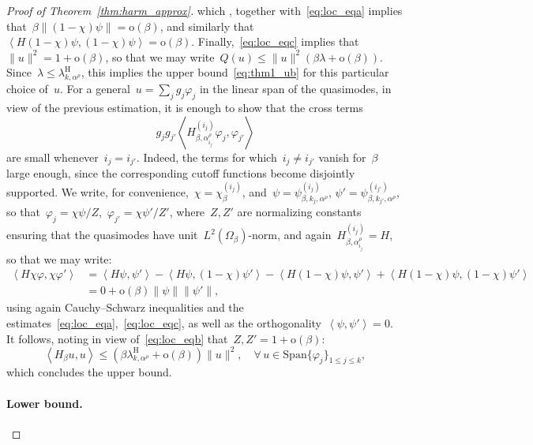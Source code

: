 \documentclass[10pt]{article}
\newcommand{\1}{\mathbbm 1}
\newcommand{\shift}{\rho} %
\begin{document}
\begin{proof}[Proof of Theorem~\ref{thm:harm_approx}]
        which , together with~\eqref{eq:loc_eqa} implies that~$\beta\|(1-\chi)\psi\|=\mathrm{o}(\beta)$, and similarly that~$\left\langle H(1-\chi)\psi,(1-\chi)\psi\right\rangle = \mathrm{o}(\beta)$.
        Finally,~\eqref{eq:loc_eqc} implies that~$\|u\|^2 = 1 + \mathrm{o}(\beta)$, so that we may write~$Q(u)\leq \|u\|^2(\beta\lambda + \mathrm{o}(\beta))$.
        Since~$\lambda\leq \lambda_{k,\alpha^\shift}^{\mathrm H}$, this implies the upper bound~\eqref{eq:thm1_ub} for this particular choice of~$u$.
        For a general~$u = \sum_j g_j \varphi_j$ in the linear span of the quasimodes, in view of the previous estimation, it is enough to show that the cross terms
        \[g_jg_{j'}\left\langle H_{\beta,\alpha_{i_j}^\shift}^{(i_j)}\varphi_j,\varphi_{j'}\right\rangle\]
        are small whenever~$i_j = i_{j'}$. Indeed, the terms for which~$i_j \neq i_{j'}$ vanish for~$\beta$ large enough, since the corresponding cutoff functions become disjointly supported.
        We write, for convenience,~$\chi = \chi_\beta^{(i_j)}$, and~$\psi = \psi^{(i_j)}_{\beta,k_j,\alpha^\shift}$, $\psi' = \psi^{(i_{j'})}_{\beta,k_{j'},\alpha^\shift}$, so that~$\varphi_j = \chi \psi/Z$,~$\varphi_{j'} = \chi\psi'/Z'$, where~$Z,Z'$ are normalizing constants ensuring that the quasimodes have unit~$L^2(\Omega_\beta)$-norm, and again~$H_{\beta,\alpha_{i_j}^\shift}^{(i_j)}=H$, so that we may write:
        \[\begin{aligned}
            \left\langle H\chi\varphi,\chi\varphi'\right\rangle &= \left\langle H\psi,\psi'\right\rangle - \left\langle H\psi,(1-\chi)\psi'\right\rangle - \left\langle H(1-\chi)\psi,\psi'\right\rangle + \left\langle H(1-\chi)\psi,(1-\chi)\psi'\right\rangle\\
            &= 0 + \mathrm{o}(\beta)\|\psi\|\|\psi'\|,
        \end{aligned}
        \]
        using again Cauchy--Schwarz inequalities and the estimates~\eqref{eq:loc_eqa},~\eqref{eq:loc_eqc}, as well as the orthogonality~$\left\langle \psi,\psi'\right\rangle = 0$.
        It follows, noting in view of~\eqref{eq:loc_eqb} that~$Z,Z' = 1 +\mathrm{o}(\beta)$:
        \[\left\langle H_\beta u,u\right\rangle \leq (\beta\lambda_{k,\alpha^\shift}^{\mathrm H}+\mathrm{o}(\beta))\|u\|^2,\quad \forall\,u\in\mathrm{Span}\{\varphi_j\}_{1\leq j\leq k},\]
        which concludes the upper bound.

        \paragraph{Lower bound.}


\end{proof}
\end{document}
